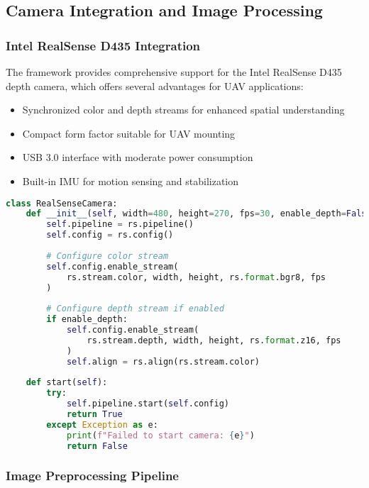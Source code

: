 \documentclass[12pt,a4paper]{article}
\begin{document}
\subsection{Camera Integration and Image Processing}

\subsubsection{Intel RealSense D435 Integration}

The framework provides comprehensive support for the Intel RealSense D435 depth camera, which offers several advantages for UAV applications:

\begin{itemize}
    \item Synchronized color and depth streams for enhanced spatial understanding
    \item Compact form factor suitable for UAV mounting
    \item USB 3.0 interface with moderate power consumption
    \item Built-in IMU for motion sensing and stabilization
\end{itemize}

\begin{lstlisting}[language=Python, caption=RealSense Camera Initialization]
class RealSenseCamera:
    def __init__(self, width=480, height=270, fps=30, enable_depth=False):
        self.pipeline = rs.pipeline()
        self.config = rs.config()
        
        # Configure color stream
        self.config.enable_stream(
            rs.stream.color, width, height, rs.format.bgr8, fps
        )
        
        # Configure depth stream if enabled
        if enable_depth:
            self.config.enable_stream(
                rs.stream.depth, width, height, rs.format.z16, fps
            )
            self.align = rs.align(rs.stream.color)
    
    def start(self):
        try:
            self.pipeline.start(self.config)
            return True
        except Exception as e:
            print(f"Failed to start camera: {e}")
            return False
\end{lstlisting}

\subsubsection{Image Preprocessing Pipeline}
\end{document}
